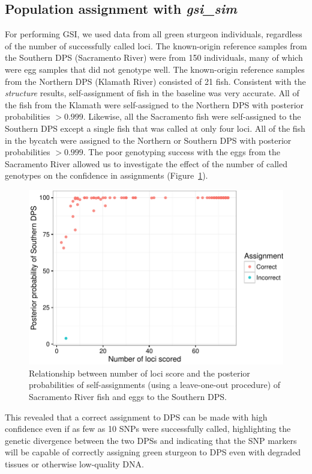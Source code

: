 \subsection{Population assignment with {\em gsi\_sim}}
For performing GSI, we used data from all green sturgeon individuals, 
regardless of the number of successfully called loci. 
The known-origin reference samples from the Southern DPS (Sacramento
River) were from 150 individuals, many of which were egg samples that did not
genotype well. The known-origin reference samples from the Northern DPS (Klamath River) 
consisted of 21
fish. Consistent with the {\em structure} results, self-assignment of fish in the
baseline was very accurate. All of the fish from the Klamath were self-assigned
to the Northern DPS with posterior probabilities $> 0.999$. Likewise, all the
Sacramento fish were self-assigned to the Southern DPS except a single fish that
was called at only four loci. All of the fish in the bycatch were assigned to the
Northern or Southern DPS with posterior probabilities $> 0.999$. The poor
genotyping success with the eggs from the Sacramento River allowed us
to investigate the effect of the number of called genotypes on the confidence in
assignments (Figure~\ref{fig:sacto-self-ass}).
\begin{figure}
\includegraphics[width = \linewidth]{inputs/self-ass-plot-crop.pdf}
\caption{ Relationship between number of loci score and the posterior probabilities of self-assignments 
(using a leave-one-out procedure) of Sacramento River fish and eggs to
the Southern DPS.  \label{fig:sacto-self-ass}}
\end{figure}
This revealed that a correct assignment to DPS can be made
with high confidence even if as few as 10 SNPs were successfully called,
highlighting the genetic divergence between the two DPSs and indicating that the
SNP markers will be capable of correctly assigning green sturgeon to DPS even with
degraded tissues or otherwise low-quality DNA.

